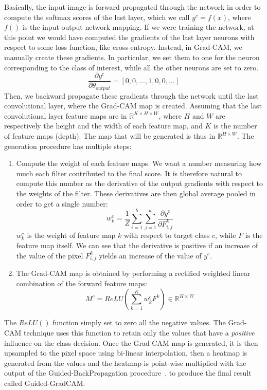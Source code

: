 \documentclass[../main.tex]{subfiles}
\begin{document}
    Basically, the input image is forward propagated through the network in order to compute the softmax scores
    of the last layer, which we call $y^{c} = f(x)$, where $f()$ is the input-output network mapping.
    If we were training the network, at this point we would have computed the gradients of the
    last layer neurons with respect to some loss function, like cross-entropy. Instead, in Grad-CAM, we manually
    create these gradients. In particular, we set them to one for the neuron corresponding to the class of interest,
    while all the other neurons are set to zero.
    $$ \frac{\partial y^{c}}{\partial \theta_{output}} = [0, 0, \ldots , 1, 0, 0, \ldots] $$
    Then, we backward propagate these gradients through the network until
    the last convolutional layer, where the Grad-CAM map is created. Assuming that the last convolutional layer feature maps are
    in $ \mathbb{R}^{K \times H \times W} $, where $H$ and $W$ are respectively the height and the width of each feature
    map, and $K$ is the number of feature maps (depth). The map that will be generated is thus in $\mathbb{R}^{H \times W}$.
    The generation procedure has multiple steps:
    \begin{enumerate}
        \item Compute the weight of each feature maps. We want a number measuring how much each filter contributed to
            the final score. It is therefore natural to compute this number as the derivative of the output gradients
            with respect to the weights of the filter. These derivatives are then global average pooled in order to get
            a single number:
            \begin{equation}
                w_{k}^{c} = \frac{1}{Z} \sum_{i = 1}^{h} \sum_{j = 1}^{w} \frac{\partial y^{c}}{\partial F_{i, j}^{k}}
            \end{equation}
            $w_{k}^{c}$ is the weight of feature map $k$ with respect to target class $c$, while $F$ is the feature map
            itself. We can see that the derivative is positive if an increase of the value of the pixel $F_{i, j}^{k}$ yields
            an increase of the value of $y^{c}$.
        \item The Grad-CAM map is obtained by performing a rectified weighted linear combination of the forward feature maps:
            \begin{equation}\label{eq:gradcamMaps}
                M^{c} = ReLU \left( \sum_{k = 1}^{K} w_{k}^{c} F^{k} \right) \in \mathbb{R}^{H \times W}
            \end{equation}
    \end{enumerate}
    The $ReLU()$ function simply set to zero all the negative values. The Grad-CAM technique uses this function to retain only
    the values that have a \textit{positive} influence on the class decision.
    Once the Grad-CAM map is generated, it is then upsampled to the pixel space using bi-linear interpolation, then a heatmap
    is generated from the values and the heatmap is point-wise multiplied with the output of the Guided-BackPropagation
    procedure~\cite{guidedbackprop}, to produce the final result called Guided-GradCAM.\@
\end{document}
